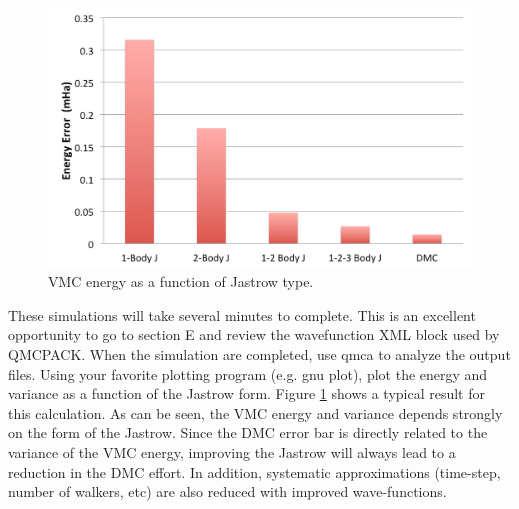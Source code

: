 \begin{figure}
\begin{center}
\includegraphics[trim = 0mm 0mm 0mm 0mm, clip,width=0.75\columnwidth]{figures/lab_advanced_molecules_vmc_jastrow.png}
\end{center}
\caption{VMC energy as a function of Jastrow type.}
\label{fig:lam_vmc_jastrow}
\end{figure}

These simulations will take several minutes to complete. This is an excellent opportunity
to go to section E and review the wavefunction XML block used by QMCPACK. When the
simulation are completed, use qmca to analyze the output files. Using your favorite plotting
program (e.g. gnu plot), plot the energy and variance as a function of the Jastrow form.
Figure \ref{fig:lam_vmc_jastrow} shows a typical result for this calculation. As can be seen, the VMC energy and
variance depends strongly on the form of the Jastrow. Since the DMC error bar is directly
related to the variance of the VMC energy, improving the Jastrow will always lead to a
reduction in the DMC effort. In addition, systematic approximations (time-step, number of
walkers, etc) are also reduced with improved wave-functions.



